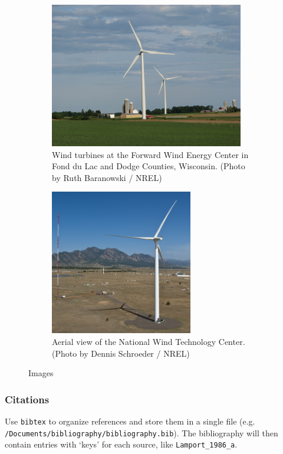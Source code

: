\begin{figure}
          \begin{subfigure}[t]{.55\linewidth}
            \centering
            \includegraphics[height=2.5in]{files/21206}
            \caption{Wind turbines at the Forward Wind Energy Center in Fond du Lac and Dodge Counties, Wisconsin. (Photo by Ruth Baranowski / NREL)}\label{fig:21206}
          \end{subfigure}%
          \begin{subfigure}[t]{.55\linewidth}
            \centering
            \includegraphics[height=2.5in]{files/20018}
            \caption{Aerial view of the National Wind Technology Center. (Photo by Dennis Schroeder / NREL)}\label{fig:20018}
          \end{subfigure}
          \caption{Images}\label{fig:NRELimages}
\end{figure}

\subsubsection{Citations}
\label{Sec:Bib}
Use \texttt{bibtex} to organize references and store them in a single file (e.g. \verb+/Documents/bibliography/bibliography.bib+). The bibliography will then contain entries with `keys' for each source, like \texttt{Lamport\_1986\_a}. 

